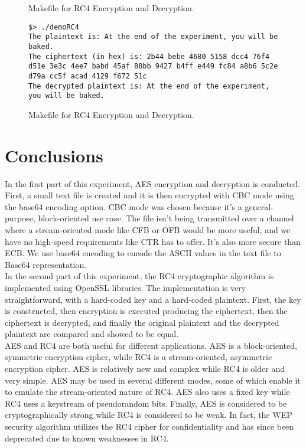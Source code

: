 \documentclass{article}
\begin{document}
\begin{figure}
\begin{mdframed}

\end{mdframed}
\caption{Makefile for RC4 Encryption and Decryption.}
\label{fig:step2bb}
\end{figure}

\begin{figure}
\begin{mdframed}
\begin{lstlisting}
$> ./demoRC4
The plaintext is: At the end of the experiment, you will be baked.
The ciphertext (in hex) is: 2b44 bebe 4680 5158 dcc4 76f4 d51e 3e3c 4ee7 babd 45af 88bb 9427 b4ff e449 fc84 a8b6 5c2e d79a cc5f acad 4129 f672 51c
The decrypted plaintext is: At the end of the experiment, you will be baked.
\end{lstlisting}
\end{mdframed}
\caption{Makefile for RC4 Encryption and Decryption.}
\label{fig:step2bc}
\end{figure}


\section{Conclusions}

In the first part of this experiment, AES encryption and decryption is conducted. First, a small text file is created and it is then
encrypted with CBC mode using the base64 encoding option. CBC mode was chosen because it's a general-purpose, block-oriented use case.
The file isn't being transmitted over a channel where a stream-oriented mode like CFB or OFB would be more useful, and we have no
high-speed requirements like CTR has to offer. It's also more secure than ECB. We use base64 encoding to encode the ASCII values in the
text file to Base64 representation.
\\[12pt]
In the second part of this experiment, the RC4 cryptographic algorithm is implemented using OpenSSL libraries. The implementation is very
straightforward, with a hard-coded key and a hard-coded plaintext. First, the key is constructed, then encryption is executed producing the
ciphertext, then the ciphertext is decrypted, and finally the original plaintext and the decrypted plaintext are compared and showed to be
equal.
\\[12pt]
AES and RC4 are both useful for different applications. AES is a block-oriented, symmetric encryption cipher, while RC4 is a
stream-oriented, asymmetric encryption cipher. AES is relatively new and complex while RC4 is older and very simple. AES may be used in
several different modes, some of which enable it to emulate the stream-oriented nature of RC4. AES also uses a fixed key while RC4 uses a
keystream of pseudorandom bits. Finally, AES is considered to be cryptographically strong while RC4 is considered to be weak. In fact, the
WEP security algorithm utilizes the RC4 cipher for confidentiality and has since been deprecated due to known weaknesses in RC4.
\end{document}
